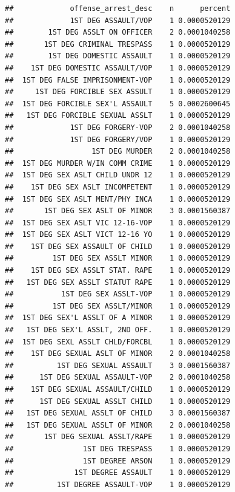 \documentclass[]{book}
\newenvironment{Shaded}{\begin{snugshade}}{\end{snugshade}}
\newcommand{\KeywordTok}[1]{\textcolor[rgb]{0.13,0.29,0.53}{\textbf{#1}}}
\newcommand{\NormalTok}[1]{#1}
\newcommand{\OperatorTok}[1]{\textcolor[rgb]{0.81,0.36,0.00}{\textbf{#1}}}
\newcommand{\StringTok}[1]{\textcolor[rgb]{0.31,0.60,0.02}{#1}}
\begin{document}
\begin{Shaded}
\end{Shaded}

\begin{verbatim}
##             offense_arrest_desc    n      percent
##             1ST DEG ASSAULT/VOP    1 0.0000520129
##        1ST DEG ASSLT ON OFFICER    2 0.0001040258
##       1ST DEG CRIMINAL TRESPASS    1 0.0000520129
##        1ST DEG DOMESTIC ASSAULT    1 0.0000520129
##    1ST DEG DOMESTIC ASSAULT/VOP    1 0.0000520129
##  1ST DEG FALSE IMPRISONMENT-VOP    1 0.0000520129
##     1ST DEG FORCIBLE SEX ASSULT    1 0.0000520129
##  1ST DEG FORCIBLE SEX'L ASSAULT    5 0.0002600645
##   1ST DEG FORCIBLE SEXUAL ASSLT    1 0.0000520129
##             1ST DEG FORGERY-VOP    2 0.0001040258
##             1ST DEG FORGERY/VOP    1 0.0000520129
##                  1ST DEG MURDER    2 0.0001040258
##  1ST DEG MURDER W/IN COMM CRIME    1 0.0000520129
##  1ST DEG SEX ASLT CHILD UNDR 12    1 0.0000520129
##    1ST DEG SEX ASLT INCOMPETENT    1 0.0000520129
##  1ST DEG SEX ASLT MENT/PHY INCA    1 0.0000520129
##       1ST DEG SEX ASLT OF MINOR    3 0.0001560387
##  1ST DEG SEX ASLT VIC 12-16-VOP    1 0.0000520129
##  1ST DEG SEX ASLT VICT 12-16 YO    1 0.0000520129
##    1ST DEG SEX ASSAULT OF CHILD    1 0.0000520129
##         1ST DEG SEX ASSLT MINOR    1 0.0000520129
##    1ST DEG SEX ASSLT STAT. RAPE    1 0.0000520129
##   1ST DEG SEX ASSLT STATUT RAPE    1 0.0000520129
##           1ST DEG SEX ASSLT-VOP    1 0.0000520129
##         1ST DEG SEX ASSLT/MINOR    1 0.0000520129
##  1ST DEG SEX'L ASSLT OF A MINOR    1 0.0000520129
##   1ST DEG SEX'L ASSLT, 2ND OFF.    1 0.0000520129
##  1ST DEG SEXL ASSLT CHLD/FORCBL    1 0.0000520129
##    1ST DEG SEXUAL ASLT OF MINOR    2 0.0001040258
##          1ST DEG SEXUAL ASSAULT    3 0.0001560387
##      1ST DEG SEXUAL ASSAULT-VOP    2 0.0001040258
##    1ST DEG SEXUAL ASSAULT/CHILD    1 0.0000520129
##      1ST DEG SEXUAL ASSLT CHILD    1 0.0000520129
##   1ST DEG SEXUAL ASSLT OF CHILD    3 0.0001560387
##   1ST DEG SEXUAL ASSLT OF MINOR    2 0.0001040258
##       1ST DEG SEXUAL ASSLT/RAPE    1 0.0000520129
##                1ST DEG TRESPASS    1 0.0000520129
##                1ST DEGREE ARSON    1 0.0000520129
##              1ST DEGREE ASSAULT    1 0.0000520129
##          1ST DEGREE ASSAULT-VOP    1 0.0000520129

\end{verbatim}
\end{document}
